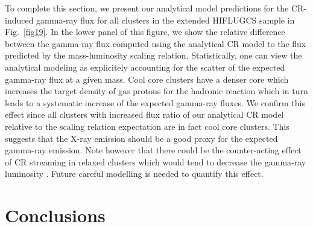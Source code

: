 \documentclass[10pt,aps,pra,reprint,amsmath,amsfonts,amssymb,showpacs,nofootinbib,floatfix]{revtex4-1}
\begin{document}
To complete this section, we present our analytical model predictions
for the CR-induced gamma-ray flux for all clusters in the extended
HIFLUGCS sample in Fig.~\ref{fig19}. In the lower panel of this
figure, we show the relative difference between the gamma-ray flux
computed using the analytical CR model to the flux predicted by the
mass-luminosity scaling relation. Statistically, one can view the
analytical modeling as explicitely accounting for the scatter of the expected
gamma-ray flux at a given mass. Cool core clusters have a denser core
which increases the target density of gas protons for the hadronic
reaction which in turn leads to a systematic increase of the expected
gamma-ray fluxes. We confirm this effect since all clusters with
increased flux ratio of our analytical CR model relative to the scaling relation
expectation are in fact cool core clusters. This suggests that the X-ray
emission should be a good proxy for the expected gamma-ray
emission. Note however that there could be the counter-acting effect
of CR streaming in relaxed clusters which would tend to decrease the
gamma-ray luminosity \cite{2011A&A...527A..99E}. Future careful
modelling is needed to quantify this effect.


\section{Conclusions}
\end{document}
